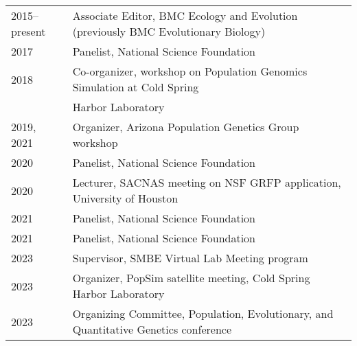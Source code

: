 \documentclass[11pt]{article}
\begin{document}
\begin{longtable}[l]{l l}
2015--present & Associate Editor, BMC Ecology and Evolution (previously BMC Evolutionary Biology)\\
2017 & Panelist, National Science Foundation\\%
2018 & Co-organizer, workshop on Population Genomics Simulation at Cold Spring\\
& Harbor Laboratory\\
2019, 2021 & Organizer, Arizona Population Genetics Group workshop\\
2020 & Panelist, National Science Foundation\\%
2020 & Lecturer, SACNAS meeting on NSF GRFP application, University of Houston\\
2021 & Panelist, National Science Foundation\\%
2021 & Panelist, National Science Foundation\\%
2023 & Supervisor, SMBE Virtual Lab Meeting program\\
2023 & Organizer, PopSim satellite meeting, Cold Spring Harbor Laboratory\\
2023 & Organizing Committee, Population, Evolutionary, and Quantitative Genetics conference\\
\end{longtable}
\end{document}
